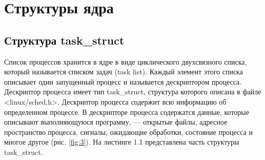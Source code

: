 \section{Структуры ядра}

\subsection{Структура task\_struct}

Список процессов хранится в ядре в виде циклического двухсвязного списка, 
который называется списком задач (task list). 
Каждый элемент этого списка описывает один
запущенный процесс и называется дескриптором процесса. Дескриптор процесса имеет
тип task\_struct, структура которого описана в файле <linux/sched.h>. 
Дескриптор процесса содержит всю информацию об определенном процессе.
В дескрипторе процесса содержатся данные, которые описывают выполняющуюся
программу, — открытые файлы, адресное пространство процесса, сигналы, ожидающие
обработки, состояние процесса и многое другое (рис. \ref{fig:3}). 
На листинге 1.1 представлена часть структуры task\_struct.

\begin{figure}[ht!]
\end{figure}

\newpage

